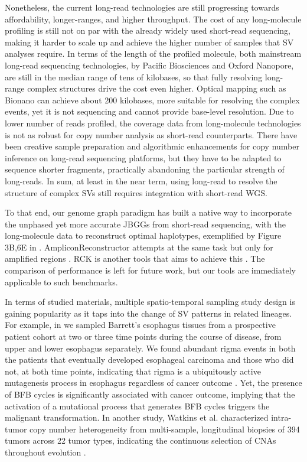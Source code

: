 \documentclass[phd,tocprelim]{cornell}
\begin{document}
Nonetheless, the current long-read technologies are still progressing towards affordability, longer-ranges, and higher throughput. The cost of any long-molecule profiling is still not on par with the already widely used short-read sequencing, making it harder to scale up and achieve the higher number of samples that SV analyses require. In terms of the length of the profiled molecule, both mainstream long-read sequencing technologies, by Pacific Biosciences and Oxford Nanopore, are still in the median range of tens of kilobases, so that fully resolving long-range complex structures drive the cost even higher. Optical mapping such as Bionano can achieve about 200 kilobases, more suitable for resolving the complex events, yet it is not sequencing and cannot provide base-level resolution. Due to lower number of reads profiled, the coverage data from long-molecule technologies is not as robust for copy number analysis as short-read counterparts. There have been creative sample preparation and algorithmic enhancements \cite{Baslan2020-hz,Prabakar2019-dw} for copy number inference on long-read sequencing platforms, but they have to be adapted to sequence shorter fragments, practically abandoning the particular strength of long-reads. In sum, at least in the near term, using long-read to resolve the structure of complex SVs still requires integration with short-read WGS.

To that end, our genome graph paradigm has built a native way to incorporate the unphased yet more accurate JBGGs from short-read sequencing, with the long-molecule data to reconstruct optimal haplotypes, exemplified by Figure 3B,6E in \cite{Hadi2020-um}. AmpliconReconstructor attempts at the same task but only for amplified regions \cite{Luebeck2020-ow}. RCK is another tools that aims to achieve this \cite{Aganezov2020-cu}. The comparison of performance is left for future work, but our tools are immediately applicable to such benchmarks.

In terms of studied materials, multiple spatio-temporal sampling study design is gaining popularity as it taps into the change of SV patterns in related lineages. For example, in \cite{Paulson2021-nd} we sampled Barrett's esophagus tissues from a prospective patient cohort at two or three time points during the course of disease, from upper and lower esophagus separately. We found abundant rigma events in both the patients that eventually developed esophageal carcinoma and those who did not, at both time points, indicating that rigma is a ubiquitously active mutagenesis process in esophagus regardless of cancer outcome \cite{Hadi2020-um}. Yet, the presence of BFB cycles is significantly associated with cancer outcome, implying that the activation of a mutational process that generates BFB cycles triggers the malignant transformation. In another study, Watkins et al. characterized intra-tumor copy number heterogeneity from multi-sample, longitudinal biopsies of 394 tumors across 22 tumor types, indicating the continuous selection of CNAs throughout evolution \cite{Watkins2020-qp}.
\end{document}

